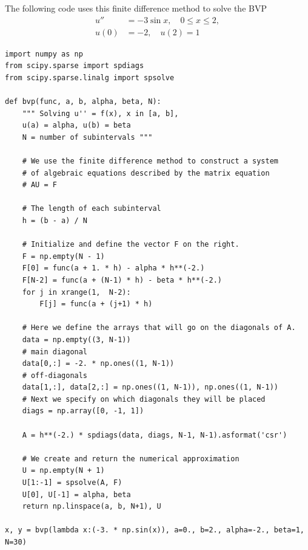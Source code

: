 The following code uses this finite difference method to solve the BVP
\begin{align*}
u'' &= -3 \sin{x}, \quad 0 \leq x \leq 2,\\
	u(0) &= -2,\quad u(2) = 1
\end{align*}

\begin{lstlisting}
import numpy as np
from scipy.sparse import spdiags
from scipy.sparse.linalg import spsolve

def bvp(func, a, b, alpha, beta, N):
    """ Solving u'' = f(x), x in [a, b],
    u(a) = alpha, u(b) = beta
    N = number of subintervals """
    
    # We use the finite difference method to construct a system 
    # of algebraic equations described by the matrix equation 
    # AU = F
    
    # The length of each subinterval
    h = (b - a) / N
    
    # Initialize and define the vector F on the right.
    F = np.empty(N - 1)
    F[0] = func(a + 1. * h) - alpha * h**(-2.)
    F[N-2] = func(a + (N-1) * h) - beta * h**(-2.)
    for j in xrange(1,  N-2): 
        F[j] = func(a + (j+1) * h)

    # Here we define the arrays that will go on the diagonals of A.
    data = np.empty((3, N-1))
    # main diagonal
    data[0,:] = -2. * np.ones((1, N-1))
    # off-diagonals
    data[1,:], data[2,:] = np.ones((1, N-1)), np.ones((1, N-1))
    # Next we specify on which diagonals they will be placed
    diags = np.array([0, -1, 1])
    
    A = h**(-2.) * spdiags(data, diags, N-1, N-1).asformat('csr')
    
    # We create and return the numerical approximation
    U = np.empty(N + 1)
    U[1:-1] = spsolve(A, F)
    U[0], U[-1] = alpha, beta
    return np.linspace(a, b, N+1), U

x, y = bvp(lambda x:(-3. * np.sin(x)), a=0., b=2., alpha=-2., beta=1, N=30)
\end{lstlisting}

